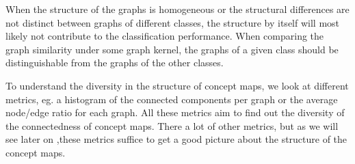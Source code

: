 When the structure of the graphs is homogeneous or the structural differences are not distinct between graphs of different classes, the structure by itself will most likely not contribute to the classification performance.
When comparing the graph similarity under some graph kernel, the graphs of a given class should be distinguishable from the graphs of the other classes.

To understand the diversity in the structure of concept maps, we look at different metrics, eg. a histogram of the connected components per graph or the average node/edge ratio for each graph.
All these metrics aim to find out the diversity of the connectedness of concept maps.
There a lot of other metrics, but as we will see later on ,these metrics suffice to get a good picture about the structure of the concept maps.
